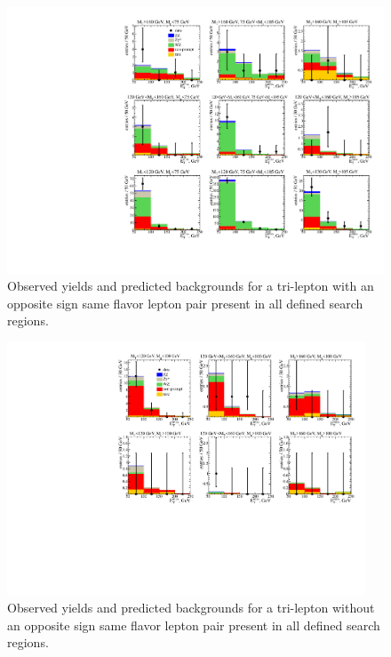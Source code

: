 \begin{figure}[htp]
\begin{center}
\includegraphics[width=1.0\textwidth]{plots/ossf1tau0.pdf}
\caption{Observed yields and predicted backgrounds for a tri-lepton with an opposite sign same flavor 
lepton pair present in all defined search regions.}
\label{fig:OSSF1tau0}
\end{center}
\end{figure}
\begin{figure}[htp]
\begin{center}
\includegraphics[width=0.95\textwidth]{plots/ossf0tau0.pdf}
\caption{Observed yields and predicted backgrounds for a tri-lepton without an opposite sign same flavor 
lepton pair present in all defined search regions.}
\label{fig:OSSF0tau0}
\end{center}
\end{figure}
